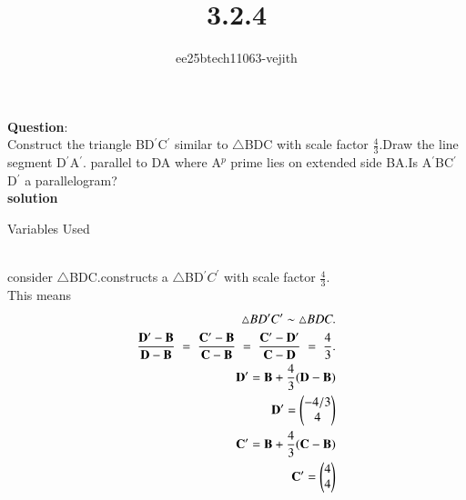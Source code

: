 \documentclass[journal]{IEEEtran}
\begin{document}

\vspace{3cm}

\title{3.2.4}
\author{ee25btech11063-vejith}

\maketitle
{\let\newpage\relax\maketitle}
\renewcommand{\thefigure}{\theenumi}
\renewcommand{\thetable}{\theenumi}
\setlength{\intextsep}{10pt} %
\textbf{Question}:\\
Construct the triangle BD$^{\prime}$C$^{\prime}$ similar to $\triangle$BDC with scale factor $\frac{4}{3}$.Draw the line segment D$^{\prime}$A$^{\prime}$. parallel to DA where A$^p$ prime lies on extended side BA.Is A$^{\prime}$BC$^{\prime}$D$^{\prime}$ a parallelogram?\\ 
\textbf{solution}
\begin{table}[h!]    
  \centering
  
  \caption{Variables Used}
  \label{}
\end{table}\\
consider $\triangle$BDC.constructs a $\triangle$BD$^{\prime}C^{\prime}$
 with scale factor $\frac{4}{3}$.\\
This means 
\begin{align}
  \triangle BD^{\prime}C^{\prime} \sim \triangle BDC.\\
\frac{\vec{D^{\prime}}-\vec{B}}{\vec{D}-\vec{B}} \;=\; \frac{\vec{C^{\prime}}-\vec{B}}{\vec{C}-\vec{B}} \;=\; \frac{\vec{C^{\prime}}-\vec{D^{\prime}}}{\vec{C}-\vec{D}} \;=\; \frac{4}{3}.\\
\Vec{D^{\prime}}=\Vec{B}+\frac{4}{3}(\Vec{D}-\Vec{B})\\
\Vec{D^{\prime}}=\myvec{-4/3\\4}\\
\Vec{C^{\prime}}=\Vec{B}+\frac{4}{3}(\Vec{C}-\Vec{B})\\
\Vec{C^{\prime}}=\myvec{4\\4}
\end{align}
\end{document}
